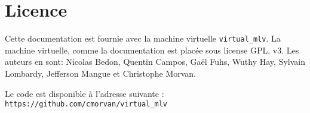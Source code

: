 \documentclass[12pt,a4paper]{article}
\begin{document}
\section{Licence}

Cette documentation est fournie avec la machine virtuelle
\texttt{virtual\_mlv}. La machine virtuelle, comme la documentation
est placée sous license GPL, v3. Les auteurs en sont: Nicolas Bedon,
Quentin Campos, Gaël Fuhs, Wuthy Hay, Sylvain Lombardy, Jefferson
Mangue et Christophe Morvan.

Le code est disponible à l'adresse suivante :
\texttt{https://github.com/cmorvan/virtual\_mlv}
\end{document}
